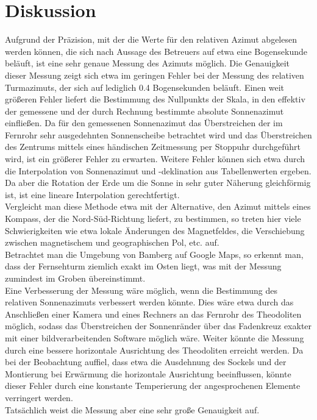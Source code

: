 \section{Diskussion}
Aufgrund der Präzision, mit der die Werte für den relativen Azimut abgelesen werden können, die sich nach Aussage des Betreuers auf etwa eine Bogensekunde beläuft, ist eine sehr genaue Messung des Azimuts möglich. Die Genauigkeit dieser Messung zeigt sich etwa im geringen Fehler bei der Messung des relativen Turmazimuts, der sich auf lediglich 0.4 Bogensekunden beläuft. Einen weit größeren Fehler liefert die Bestimmung des Nullpunkts der Skala, in den effektiv der gemessene und der durch Rechnung bestimmte absolute Sonnenazimut einfließen. Da für den gemessenen Sonnenazimut das Überstreichen der im Fernrohr sehr ausgedehnten Sonnenscheibe betrachtet wird und das Überstreichen des Zentrums mittels eines händischen Zeitmessung per Stoppuhr durchgeführt wird, ist ein größerer Fehler zu erwarten. Weitere Fehler können sich etwa durch die Interpolation von Sonnenazimut und -deklination aus Tabellenwerten ergeben. Da aber die Rotation der Erde um die Sonne in sehr guter Näherung gleichförmig ist, ist eine lineare Interpolation gerechtfertigt. \\
Vergleicht man diese Methode etwa mit der Alternative, den Azimut mittels eines Kompass, der die Nord-Süd-Richtung liefert, zu bestimmen, so treten hier viele Schwierigkeiten wie etwa lokale Änderungen des Magnetfeldes, die Verschiebung zwischen magnetischem und geographischen Pol, etc. auf. \\
Betrachtet man die Umgebung von Bamberg auf Google Maps, so erkennt man, dass der Fernsehturm ziemlich exakt im Osten liegt, was mit der Messung zumindest im Groben übereinstimmt. \\
Eine Verbesserung der Messung wäre möglich, wenn die Bestimmung des relativen Sonnenazimuts verbessert werden könnte. Dies wäre etwa durch das Anschließen einer Kamera und eines Rechners an das Fernrohr des Theodoliten möglich, sodass das Überstreichen der Sonnenränder über das Fadenkreuz exakter mit einer bildverarbeitenden Software möglich wäre. Weiter könnte die Messung durch eine bessere horizontale Ausrichtung des Theodoliten erreicht werden. Da bei der Beobachtung auffiel, dass etwa die Ausdehnung des Sockels und der Montierung bei Erwärmung die horizontale Ausrichtung beeinflussen, könnte dieser Fehler durch eine konstante Temperierung der angesprochenen Elemente verringert werden. \\
Tatsächlich weist die Messung aber eine sehr große Genauigkeit auf. 